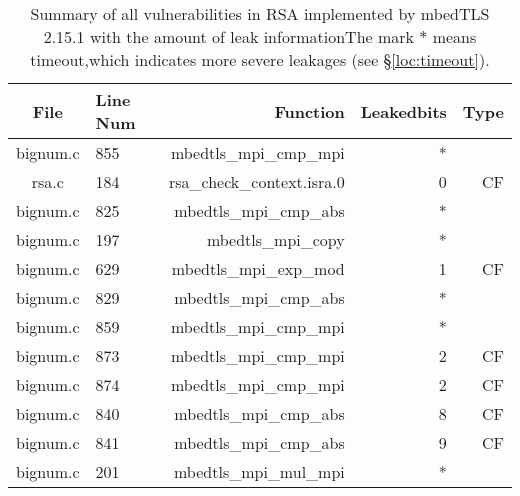 \begin{table*}%
\centering
\caption{Summary of all vulnerabilities in RSA implemented by mbedTLS 2.15.1 with the amount of leak informationThe mark $*$ means timeout,which indicates more severe leakages (see \S\ref{loc:timeout}).}\label{tab:RSAmbedTLS}
\begin{tabular}{clrrr}
\hline
\textbf{File} & \textbf{Line Num} & \textbf{Function} & \textbf{Leakedbits} & \textbf{Type} \\\hline
bignum.c&855&mbedtls\_mpi\_cmp\_mpi&*&\\
rsa.c&184&rsa\_check\_context.isra.0&0 &CF\\
bignum.c&825&mbedtls\_mpi\_cmp\_abs&*&\\
bignum.c&197&mbedtls\_mpi\_copy&*&\\
bignum.c&629&mbedtls\_mpi\_exp\_mod&1 &CF\\
bignum.c&829&mbedtls\_mpi\_cmp\_abs&*&\\
bignum.c&859&mbedtls\_mpi\_cmp\_mpi&*&\\
bignum.c&873&mbedtls\_mpi\_cmp\_mpi&2 &CF\\
bignum.c&874&mbedtls\_mpi\_cmp\_mpi&2 &CF\\
bignum.c&840&mbedtls\_mpi\_cmp\_abs&8 &CF\\
bignum.c&841&mbedtls\_mpi\_cmp\_abs&9 &CF\\
bignum.c&201&mbedtls\_mpi\_mul\_mpi&*&\\
\hline
\end{tabular}
\end{table*}